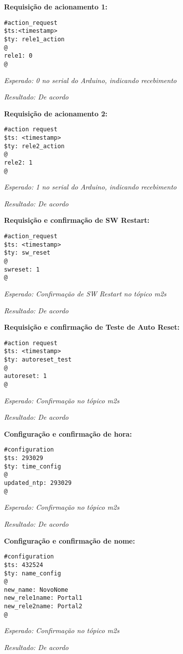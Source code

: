 \textbf{Requisição de acionamento 1:}
\begin{lstlisting}
#action_request
$ts:<timestamp>
$ty: rele1_action
@
rele1: 0
@
\end{lstlisting}

\emph{Esperado: 0 no serial do Arduino, indicando recebimento}

\emph{Resultado: De acordo}

\textbf{Requisição de acionamento 2:}
\begin{lstlisting}
#action request
$ts: <timestamp>
$ty: rele2_action
@
rele2: 1
@
\end{lstlisting}

\emph{Esperado: 1 no serial do Arduino, indicando recebimento}

\emph{Resultado: De acordo}

\textbf{Requisição e confirmação de SW Restart:}
\begin{lstlisting}
#action_request
$ts: <timestamp>
$ty: sw_reset
@
swreset: 1
@
\end{lstlisting}

\emph{Esperado: Confirmação de SW Restart no tópico \wmqtt{} m2s}

\emph{Resultado: De acordo}

\textbf{Requisição e confirmação de Teste de Auto Reset:}
\begin{lstlisting}
#action request
$ts: <timestamp>
$ty: autoreset_test
@
autoreset: 1
@
\end{lstlisting}

\emph{Esperado: Confirmação no tópico \wmqtt{} m2s}

\emph{Resultado: De acordo}

\textbf{Configuração e confirmação de hora:}
\begin{lstlisting}
#configuration
$ts: 293029
$ty: time_config
@
updated_ntp: 293029
@
\end{lstlisting}

\emph{Esperado: Confirmação no tópico \wmqtt{} m2s}

\emph{Resultado: De acordo}

\textbf{Configuração e confirmação de nome:}
\begin{lstlisting}
#configuration
$ts: 432524
$ty: name_config
@
new_name: NovoNome
new_rele1name: Portal1
new_rele2name: Portal2
@
\end{lstlisting}

\emph{Esperado: Confirmação no tópico \wmqtt{} m2s}

\emph{Resultado: De acordo}

